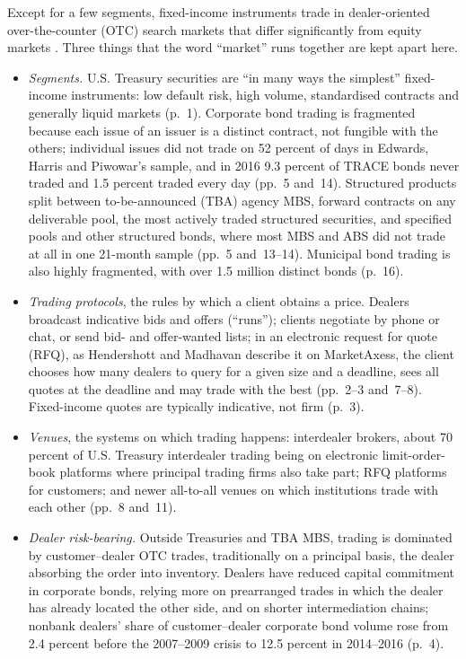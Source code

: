 \begin{qfdefinition}\label{def:fixed-income-market-structure}
 Except for a few segments, fixed-income instruments trade in dealer-oriented over-the-counter (OTC) search markets that differ significantly from equity markets \citep[sec.~I, p.~1]{wide-bsv-fi-survey}. Three things that the word ``market'' runs together are kept apart here.
\begin{itemize}
\item \emph{Segments.} U.S. Treasury securities are ``in many ways the simplest'' fixed-income instruments: low default risk, high volume, standardised contracts and generally liquid markets (p.~1). Corporate bond trading is fragmented because each issue of an issuer is a distinct contract, not fungible with the others; individual issues did not trade on 52 percent of days in Edwards, Harris and Piwowar's sample, and in 2016 9.3 percent of TRACE bonds never traded and 1.5 percent traded every day (pp.~5 and~14). Structured products split between to-be-announced (TBA) agency MBS, forward contracts on any deliverable pool, the most actively traded structured securities, and specified pools and other structured bonds, where most MBS and ABS did not trade at all in one 21-month sample (pp.~5 and~13--14). Municipal bond trading is also highly fragmented, with over 1.5 million distinct bonds (p.~16).
\item \emph{Trading protocols}, the rules by which a client obtains a price. Dealers broadcast indicative bids and offers (``runs''); clients negotiate by phone or chat, or send bid- and offer-wanted lists; in an electronic request for quote (RFQ), as Hendershott and Madhavan describe it on MarketAxess, the client chooses how many dealers to query for a given size and a deadline, sees all quotes at the deadline and may trade with the best (pp.~2--3 and~7--8). Fixed-income quotes are typically indicative, not firm (p.~3).
\item \emph{Venues}, the systems on which trading happens: interdealer brokers, about 70 percent of U.S. Treasury interdealer trading being on electronic limit-order-book platforms where principal trading firms also take part; RFQ platforms for customers; and newer all-to-all venues on which institutions trade with each other (pp.~8 and~11).
\item \emph{Dealer risk-bearing.} Outside Treasuries and TBA MBS, trading is dominated by customer--dealer OTC trades, traditionally on a principal basis, the dealer absorbing the order into inventory. Dealers have reduced capital commitment in corporate bonds, relying more on prearranged trades in which the dealer has already located the other side, and on shorter intermediation chains; nonbank dealers' share of customer--dealer corporate bond volume rose from 2.4 percent before the 2007--2009 crisis to 12.5 percent in 2014--2016 (p.~4).
\end{itemize}


\end{qfdefinition}
